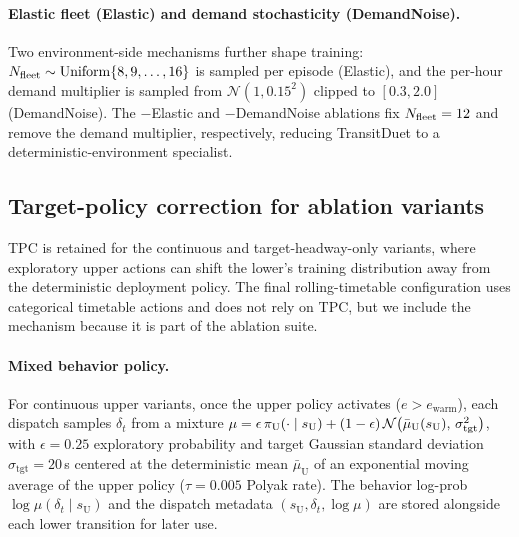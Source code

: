 \paragraph{Elastic fleet (Elastic) and demand stochasticity (DemandNoise).}
Two environment-side mechanisms further shape training: $N_{\mathrm{fleet}} \sim \mathrm{Uniform}\{8, 9, \ldots, 16\}$ is sampled per episode (Elastic), and the per-hour demand multiplier is sampled from $\mathcal{N}(1, 0.15^2)$ clipped to $[0.3, 2.0]$ (DemandNoise). The $-$Elastic and $-$DemandNoise ablations fix $N_{\mathrm{fleet}} = 12$ and remove the demand multiplier, respectively, reducing TransitDuet to a deterministic-environment specialist.

\subsection{Target-policy correction for ablation variants}
\label{sec:tpc}

TPC is retained for the continuous and target-headway-only variants, where exploratory upper actions can shift the lower's training distribution away from the deterministic deployment policy. The final rolling-timetable configuration uses categorical timetable actions and does not rely on TPC, but we include the mechanism because it is part of the ablation suite.

\paragraph{Mixed behavior policy.}
For continuous upper variants, once the upper policy activates ($e > e_{\mathrm{warm}}$), each dispatch samples $\delta_t$ from a mixture
$\mu = \epsilon \, \pi_{\mathrm{U}}(\cdot \mid s_{\mathrm U}) + (1-\epsilon) \, \mathcal{N}\!\left(\bar{\mu}_{\mathrm U}(s_{\mathrm U}),\, \sigma_{\mathrm{tgt}}^2\right)$,
with $\epsilon = 0.25$ exploratory probability and target Gaussian standard deviation $\sigma_{\mathrm{tgt}} = 20$\,s centered at the deterministic mean $\bar{\mu}_{\mathrm U}$ of an exponential moving average of the upper policy ($\tau = 0.005$ Polyak rate).
The behavior log-prob $\log \mu(\delta_t \mid s_{\mathrm U})$ and the dispatch metadata $(s_{\mathrm U}, \delta_t, \log \mu)$ are stored alongside each lower transition for later use.

